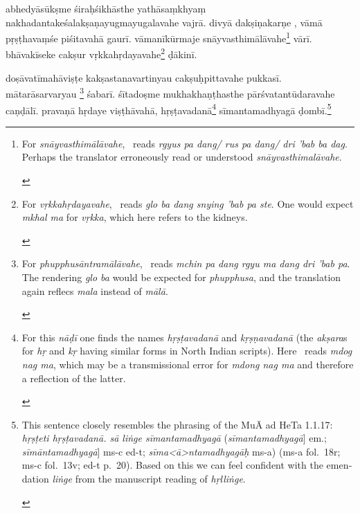 \documentclass[naipra.tex]{subfiles}
\begin{document}
\begin{sanskrit}
\pstart
abhedyāsūkṣme śiraḥśikhāsthe yathāsaṃkhyaṃ nakhadantakeśalakṣaṇayugmayugalavahe vajrā. 
divyā dakṣiṇakarṇe , vāmā pṛṣṭhavaṃśe piśitavahā gaurī. 
vāmanīkūrmaje  snāyvasthimālāvahe\footnote{
	\begin{english}%
		For \emph{snāyvasthimālāvahe}, \TIB\ reads \emph{rgyus pa dang/ rus pa dang/ dri 'bab ba dag}.
		Perhaps the translator erroneously read or understood \emph{snāyvasthimalāvahe}.
	\end{english}
} vārī. 
bhāvakīseke cakṣur vṛkkahṛdayavahe\footnote{
	\begin{english}%
		For \emph{vṛkkahṛdayavahe}, \TIB\ reads \emph{glo ba dang snying 'bab pa ste}.
		One would expect \emph{mkhal ma} for \emph{vṛkka}, which here refers to the kidneys.
	\end{english}
} ḍākinī. 
\pend

\pstart
doṣāvatīmahāviṣṭe kakṣastanavartinyau cakṣuḥpittavahe pukkasī.
mātarāsarvaryau  \footnote{
	\begin{english}%
		For \emph{phupphusāntramālāvahe}, \TIB\ reads \emph{mchin pa dang rgyu ma dang dri 'bab pa}.
		The rendering \emph{glo ba} would be expected for \emph{phupphusa}, and the translation again reflecs \emph{mala} instead of \emph{mālā}.
	\end{english}
} śabarī.
śītadoṣme mukhakhaṇṭhasthe pārśvatantūdaravahe caṇḍālī. 
pravaṇā hṛdaye viṣṭhāvahā, hṛṣṭavadanā\footnote{
	\begin{english}%
		For this \emph{nāḍī} one finds the names \emph{hṛṣṭavadanā} and \emph{kṛṣṇavadanā} (the \emph{akṣara}s for \emph{hṛ} and \emph{kṛ} having similar forms in North Indian scripts).
		Here \TIB\ reads \emph{mdog nag ma}, which may be a transmissional error for \emph{mdong nag ma} and therefore a reflection of the latter.
	\end{english}
}  sīmantamadhyagā ḍombī.\footnote{
	\begin{english}%
		This sentence closely resembles the phrasing of the MuĀ ad HeTa 1.1.17: \emph{hṛṣṭeti hṛṣṭavadanā. sā liṅge sīmantamadhyagā} (\emph{sīmantamadhyagā}] em.; \emph{sīmāntamadhyagā}] ms-c ed-t; \emph{sīma<ā>ntamadhyagāḥ} ms-a) (ms-a fol.\ 18r; ms-c fol.\ 13v; ed-t p.\ 20).
		Based on this we can feel confident with the emendation \emph{liṅge} from the manuscript reading of \emph{hṛlliṅge}.
	\end{english}
}
\pend


\end{sanskrit}
\end{document}
